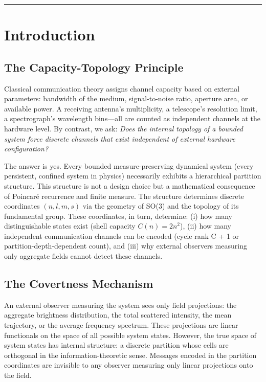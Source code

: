 \documentclass[11pt,twocolumn,a4paper]{article}
\theoremstyle{definition}
\begin{document}
\tableofcontents
\vspace{12pt}\hrule\vspace{12pt}

\section{Introduction}
\label{sec:introduction}

\subsection{The Capacity-Topology Principle}

Classical communication theory assigns channel capacity based on external parameters: bandwidth of the medium, signal-to-noise ratio, aperture area, or available power. A receiving antenna's multiplicity, a telescope's resolution limit, a spectrograph's wavelength bins—all are counted as independent channels at the hardware level. By contrast, we ask: \emph{Does the internal topology of a bounded system force discrete channels that exist independent of external hardware configuration?}

The answer is yes. Every bounded measure-preserving dynamical system (every persistent, confined system in physics) necessarily exhibits a hierarchical partition structure. This structure is not a design choice but a mathematical consequence of Poincaré recurrence and finite measure. The structure determines discrete coordinates $(n,l,m,s)$ via the geometry of SO(3) and the topology of its fundamental group. These coordinates, in turn, determine: (i) how many distinguishable states exist (shell capacity $C(n) = 2n^2$), (ii) how many independent communication channels can be encoded (cycle rank C + 1 or partition-depth-dependent count), and (iii) why external observers measuring only aggregate fields cannot detect these channels.

\subsection{The Covertness Mechanism}

An external observer measuring the system sees only field projections: the aggregate brightness distribution, the total scattered intensity, the mean trajectory, or the average frequency spectrum. These projections are linear functionals on the space of all possible system states. However, the true space of system states has internal structure: a discrete partition whose cells are orthogonal in the information-theoretic sense. Messages encoded in the partition coordinates are invisible to any observer measuring only linear projections onto the field.
\end{document}
